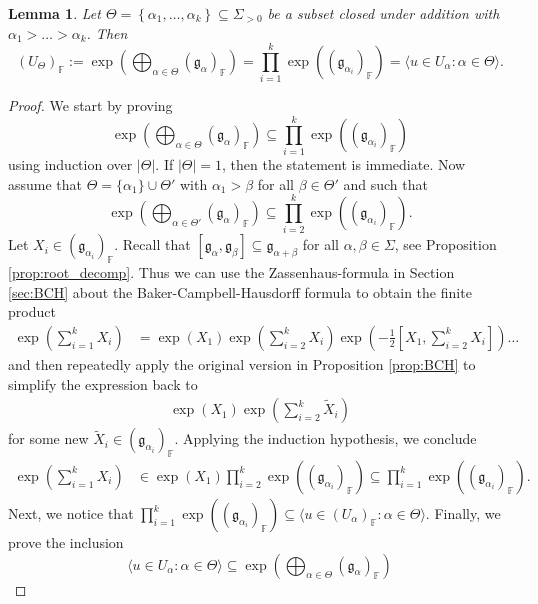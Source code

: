 \documentclass[12pt]{amsart}
\newcommand{\F}{\mathbb{F} }
\newcommand{\frakg}{\mathfrak{g}}
\numberwithin{equation}{section}
\newtheorem{lemma}[theorem]{Lemma}
\theoremstyle{remark} %
\begin{document}
\begin{lemma}\label{lem:BCH_consequence}
	Let $\Theta = \left\{ \alpha_1, \ldots , \alpha_k \right\} \subseteq \Sigma_{>0}$ be a subset closed under addition with $\alpha_1 > \ldots > \alpha_k$. Then
	$$	
	(U_{\Theta})_\F := \exp\left( \bigoplus_{\alpha \in \Theta} (\frakg_\alpha)_\F\right)
	= \prod_{i = 1}^k \exp\left(\left(\frakg_{\alpha_i}\right)_\F\right) = \langle u \in U_{\alpha} \colon \alpha \in \Theta \rangle.
	$$
\end{lemma}
\begin{proof}
	We start by proving
	$$
	\exp\left( \bigoplus_{\alpha \in \Theta} (\frakg_\alpha)_\F\right) \subseteq  \prod_{i = 1}^k \exp\left(\left(\frakg_{\alpha_i}\right)_\F\right) 
	$$
    using induction over $|\Theta|$. If $|\Theta| =1$, then the statement is immediate. Now assume that $\Theta = \{\alpha_1\} \cup \Theta'$ with $\alpha_1 >\beta$ for all $\beta \in \Theta'$ and such that
	$$	
	\exp\left( \bigoplus_{\alpha \in \Theta'} (\frakg_\alpha)_\F\right)
	\subseteq \prod_{i = 2}^k \exp\left(\left(\frakg_{\alpha_i}\right)_\F\right) .
	$$
	Let $X_i \in (\frakg_{\alpha_i})_\F$. 
Recall that $[\frakg_\alpha, \frakg_{\beta}] \subseteq \frakg_{\alpha + \beta}$ for all $\alpha, \beta \in \Sigma$, see Proposition \ref{prop:root_decomp}. Thus we can use the Zassenhaus-formula in Section \ref{sec:BCH} about the Baker-Campbell-Hausdorff formula to obtain the finite product
	\begin{align*}
		\exp\left( \sum_{i=1}^k X_i \right) &= \exp(X_1)\exp\left(\sum_{i=2}^k X_i\right) \exp\left( -\frac{1}{2}\left[ X_1, \sum_{i=2}^k X_i  \right] \right)  \ldots 
	\end{align*}
	and then repeatedly apply the original version in Proposition \ref{prop:BCH} to simplify the expression back to
	\begin{align*}
		\exp(X_1)\exp\left(\sum_{i=2}^{k} \tilde{X}_i\right) 
	\end{align*}
	for some new $\tilde{X}_i \in (\frakg_{\alpha_i})_\F$.  Applying the induction hypothesis, we conclude
	\begin{align*}
		\exp\left( \sum_{i=1}^k X_i \right) &\in  \exp(X_1) \prod_{i=2}^k \exp\left(\left(\frakg_{\alpha_i}\right)_\F\right) \subseteq \prod_{i = 1}^k \exp\left(\left(\frakg_{\alpha_i}\right)_\F\right).
	\end{align*}
	Next, we notice that $\prod_{i=1}^k \exp((\frakg_{\alpha_i})_\F) \subseteq \langle u \in (U_{\alpha})_\F \colon \alpha \in \Theta\rangle$. Finally, we prove the inclusion
	$$
 \langle u \in U_{\alpha} \colon \alpha \in \Theta \rangle \subseteq \exp\left( \bigoplus_{\alpha \in \Theta} (\frakg_\alpha)_\F\right)
$$
\end{proof}
\end{document}
